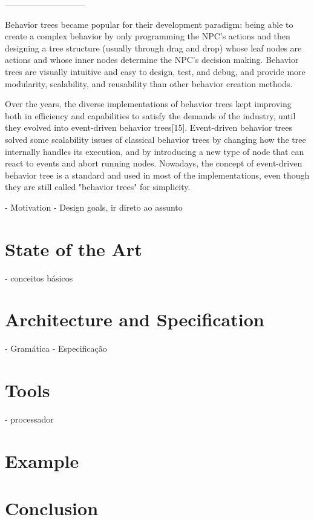 \documentclass[a4paper,UKenglish,cleveref, autoref, thm-restate]{oasics-v2019}
\begin{document}
-----------------------------



Behavior trees became popular for their development paradigm: being able to create a complex behavior by only programming the NPC's actions and then designing a tree structure (usually through drag and drop) whose leaf nodes are actions and whose inner nodes determine the NPC's decision making. Behavior trees are visually intuitive and easy to design, test, and debug, and provide more modularity, scalability, and reusability than other behavior creation methods.

Over the years, the diverse implementations of behavior trees kept improving both in efficiency and capabilities to satisfy the demands of the industry, until they evolved into event-driven behavior trees[15]. Event-driven behavior trees solved some scalability issues of classical behavior trees by changing how the tree internally handles its execution, and by introducing a new type of node that can react to events and abort running nodes. Nowadays, the concept of event-driven behavior tree is a standard and used in most of the implementations, even though they are still called "behavior trees" for simplicity.

- Motivation
- Design goals, ir direto ao assunto

\section{State of the Art}
\label{sec:state-of-the-art}
- conceitos básicos

\section{Architecture and Specification}
\label{sec:arc-spec}

- Gramática
- Especificação


\section{Tools}
\label{sec:tools}
- processador

\section{Example}
\label{sec:example}

\section{Conclusion}
\label{sec:conclusion}
\end{document}
